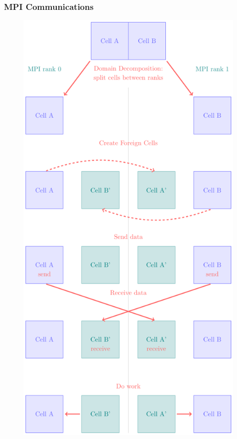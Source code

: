 \subsubsection{MPI Communications}


\begin{figure}
 \centering
 \includegraphics[height=.8\textheight]{figures/Meshless/mpi_comm.pdf}

\end{figure}

